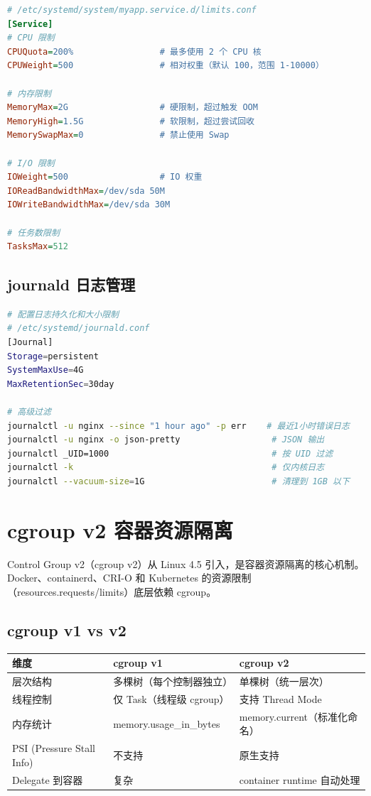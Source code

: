 \documentclass[12pt,UTF8]{ctexbook}
\begin{document}
\begin{lstlisting}[language=ini]
# /etc/systemd/system/myapp.service.d/limits.conf
[Service]
# CPU 限制
CPUQuota=200%                 # 最多使用 2 个 CPU 核
CPUWeight=500                 # 相对权重（默认 100，范围 1-10000）

# 内存限制
MemoryMax=2G                  # 硬限制，超过触发 OOM
MemoryHigh=1.5G               # 软限制，超过尝试回收
MemorySwapMax=0               # 禁止使用 Swap

# I/O 限制
IOWeight=500                  # IO 权重
IOReadBandwidthMax=/dev/sda 50M
IOWriteBandwidthMax=/dev/sda 30M

# 任务数限制
TasksMax=512
\end{lstlisting}

\subsection*{journald 日志管理}

\begin{lstlisting}[language=bash]
# 配置日志持久化和大小限制
# /etc/systemd/journald.conf
[Journal]
Storage=persistent
SystemMaxUse=4G
MaxRetentionSec=30day

# 高级过滤
journalctl -u nginx --since "1 hour ago" -p err    # 最近1小时错误日志
journalctl -u nginx -o json-pretty                  # JSON 输出
journalctl _UID=1000                                # 按 UID 过滤
journalctl -k                                       # 仅内核日志
journalctl --vacuum-size=1G                         # 清理到 1GB 以下
\end{lstlisting}

\section{cgroup v2 容器资源隔离}
\label{sec:cgroup-v2}

Control Group v2（cgroup v2）从 Linux 4.5 引入，是容器资源隔离的核心机制。Docker、containerd、CRI-O 和 Kubernetes 的资源限制（resources.requests/limits）底层依赖 cgroup。

\subsection*{cgroup v1 vs v2}

\begin{tabular}{|p{3cm}|p{4.5cm}|p{4.5cm}|}
\hline
\textbf{维度} & \textbf{cgroup v1} & \textbf{cgroup v2} \\
\hline
层次结构 & 多棵树（每个控制器独立） & 单棵树（统一层次） \\
\hline
线程控制 & 仅 Task（线程级 cgroup） & 支持 Thread Mode \\
\hline
内存统计 & memory.usage\_in\_bytes & memory.current（标准化命名） \\
\hline
PSI (Pressure Stall Info) & 不支持 & 原生支持 \\
\hline
Delegate 到容器 & 复杂 & container runtime 自动处理 \\
\hline
\end{tabular}
\end{document}

